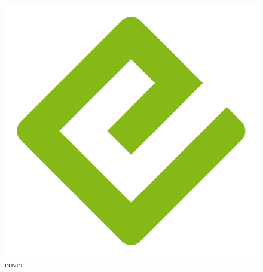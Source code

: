 \documentclass[
  a4paper,
]{scrbook}
\begin{document}
\begin{figure}

{\centering \includegraphics{./cover.png}

}

\caption{cover}

\end{figure}


\backmatter
\end{document}
